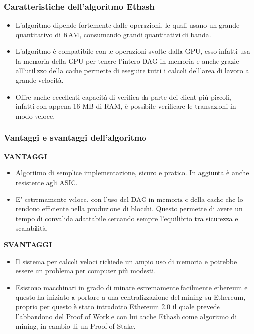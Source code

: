 \documentclass[a4paper,11pt]{report}
\begin{document}
\subsubsection{Caratteristiche dell'algoritmo Ethash}
\begin{itemize}
\item L'algoritmo dipende fortemente dalle operazioni, le quali usano un grande quantitativo di RAM, consumando grandi quantitativi di banda.
\item L'algoritmo è compatibile con le operazioni svolte dalla GPU, esso infatti usa la memoria della GPU per tenere l'intero DAG in memoria e anche grazie all'utilizzo della cache permette di eseguire tutti i calcoli dell'area di lavoro a grande velocità.
\item Offre anche eccellenti capacità di verifica da parte dei client più piccoli, infatti con appena 16 MB di RAM, è possibile verificare le transazioni in modo veloce.
\end{itemize}

\subsubsection{Vantaggi e svantaggi dell'algoritmo}
\textbf{VANTAGGI}\\
\begin{itemize}
\item Algoritmo di semplice implementazione, sicuro e pratico. In aggiunta è anche resistente agli ASIC.
\item E' estremamente veloce, con l'uso del DAG in memoria e della cache che lo rendono efficiente nella produzione di blocchi. Questo permette di avere un tempo di convalida adattabile cercando sempre l'equilibrio tra sicurezza e scalabilità.
\end{itemize}
\textbf{SVANTAGGI}\\
\begin{itemize}
\item Il sistema per calcoli veloci richiede un ampio uso di memoria e potrebbe essere un problema per computer più modesti.
\item Esistono macchinari in grado di minare estremamente facilmente ethereum e questo ha iniziato a portare a una centralizzazione del mining su Ethereum, proprio per questo è stato introdotto Ethereum 2.0 il quale prevede l'abbandono del Proof of Work e con lui anche Ethash come algoritmo di mining, in cambio di un Proof of Stake.  
\end{itemize}
\end{document}
